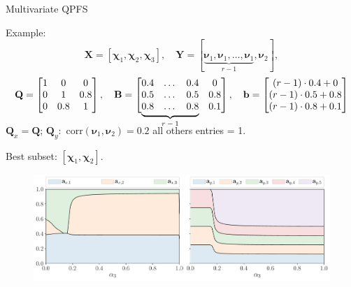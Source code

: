 \documentclass[9pt]{beamer}
\newcommand{\bb}{\mathbf{b}}
\newcommand{\bY}{\mathbf{Y}}
\newcommand{\bX}{\mathbf{X}}
\newcommand{\bB}{\mathbf{B}}
\newcommand{\bQ}{\mathbf{Q}}
\newcommand{\bchi}{\boldsymbol{\chi}}
\newcommand{\bnu}{\boldsymbol{\nu}}
\newcommand\undermat[2]{%
	\makebox[0pt][l]{$\smash{\underbrace{\phantom{%
					\begin{matrix}#2\end{matrix}}}_{\text{$#1$}}}$}#2}
\begin{document}
\begin{frame}{Multivariate QPFS}
	\begin{block}{Example:}
		\vspace{-0.5cm}
		\[
		\bX = [\bchi_1, \bchi_2, \bchi_3], \quad \bY = [\underbrace{\bnu_1, \bnu_1, \dots, \bnu_1}_{r-1}, \bnu_2],
		\]
		\vspace{-0.2cm}
		\[
		\bQ = \begin{bmatrix} 1 & 0 & 0\\ 0 & 1 & 0.8 \\ 0 & 0.8 & 1 \end{bmatrix}, \quad 
		\bB = \begin{bmatrix} 0.4 & \dots & 0.4 & 0 \\ 0.5 & \dots & 0.5 & 0.8 \\ \undermat{r-1}{0.8 & \dots & 0.8} & 0.1 \end{bmatrix}, \quad
		\bb = \begin{bmatrix} (r-1) \cdot 0.4 + 0 \\ (r-1) \cdot 0.5 + 0.8 \\ (r-1) \cdot 0.8 + 0.1 \end{bmatrix}
		\]
	\end{block}
	\vspace{0.2cm}
	\begin{center}
$\bQ_x = \bQ$; $\bQ_y:$ $\text{corr}(\bnu_1, \bnu_2) = 0.2$ all others entries = 1. 
\end{center}
Best subset: $[\bchi_1, \bchi_2]$.
\begin{figure}
	\centering
	\includegraphics[width=\linewidth]{figs/features_vs_alpha.pdf}
\end{figure}
\end{frame}
\end{document}
